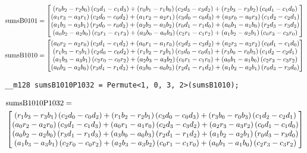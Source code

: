 \begin{align*}
\mathrm{sumsB0101} 
=
\begin{bmatrix}
  \left(r_0b_2 - r_2b_0\right)\left(c_3d_1 - c_1d_3\right)
+ \left(r_0b_1 - r_1b_0\right)\left(c_2d_3 - c_3d_2\right)
+ \left(r_2b_3 - r_3b_2\right)\left(c_0d_1 - c_1d_0\right)\\
  \left(a_1r_3 - a_3r_1\right)\left(c_2d_0 - c_0d_2\right)
+ \left(a_1r_2 - a_2r_1\right)\left(c_3d_0 - c_0d_3\right)
+ \left(a_3r_0 - a_0r_3\right)\left(c_1d_2 - c_2d_1\right)\\
  \left(a_1b_3 - a_3b_1\right)\left(r_2d_0 - r_0d_2\right)
+ \left(a_2b_3 - a_3b_2\right)\left(r_0d_1 - r_1d_0\right)
+ \left(a_0b_1 - a_1b_0\right)\left(r_2d_3 - r_3d_2\right)\\
  \left(a_0b_2 - a_2b_0\right)\left(c_3r_1 - c_1r_3\right)
+ \left(a_3b_0 - a_0b_3\right)\left(c_2r_1 - c_1r_2\right)
+ \left(a_1b_2 - a_2b_1\right)\left(c_0r_3 - c_3r_0\right)\\
\end{bmatrix}
\\
\mathrm{sumsB1010} 
=
\begin{bmatrix}
  \left(a_0r_2 - a_2r_0\right)\left(c_3d_1 - c_1d_3\right)
+ \left(a_0r_1 - a_1r_0\right)\left(c_2d_3 - c_3d_2\right)
+ \left(a_2r_3 - a_3r_2\right)\left(c_0d_1 - c_1d_0\right)\\
  \left(r_1b_3 - r_3b_1\right)\left(c_2d_0 - c_0d_2\right)
+ \left(r_1b_2 - r_2b_1\right)\left(c_3d_0 - c_0d_3\right)
+ \left(r_3b_0 - r_0b_3\right)\left(c_1d_2 - c_2d_1\right)\\
  \left(a_1b_3 - a_3b_1\right)\left(c_2r_0 - c_0r_2\right)
+ \left(a_2b_3 - a_3b_2\right)\left(c_0r_1 - c_1r_0\right)
+ \left(a_0b_1 - a_1b_0\right)\left(c_2r_3 - c_3r_2\right)\\
  \left(a_0b_2 - a_2b_0\right)\left(r_3d_1 - r_1d_3\right)
+ \left(a_3b_0 - a_0b_3\right)\left(r_2d_1 - r_1d_2\right)
+ \left(a_1b_2 - a_2b_1\right)\left(r_0d_3 - r_3d_0\right)\\
\end{bmatrix}
\end{align*}


\begin{verbatim}
__m128 sumsB1010P1032 = Permute<1, 0, 3, 2>(sumsB1010);
\end{verbatim}

\begin{align*}
&\mathrm{sumsB1010P1032} 
=\\
&\begin{bmatrix}
  \left(r_1b_3 - r_3b_1\right)\left(c_2d_0 - c_0d_2\right)
+ \left(r_1b_2 - r_2b_1\right)\left(c_3d_0 - c_0d_3\right)
+ \left(r_3b_0 - r_0b_3\right)\left(c_1d_2 - c_2d_1\right)\\
  \left(a_0r_2 - a_2r_0\right)\left(c_3d_1 - c_1d_3\right)
+ \left(a_0r_1 - a_1r_0\right)\left(c_2d_3 - c_3d_2\right)
+ \left(a_2r_3 - a_3r_2\right)\left(c_0d_1 - c_1d_0\right)\\
  \left(a_0b_2 - a_2b_0\right)\left(r_3d_1 - r_1d_3\right)
+ \left(a_3b_0 - a_0b_3\right)\left(r_2d_1 - r_1d_2\right)
+ \left(a_1b_2 - a_2b_1\right)\left(r_0d_3 - r_3d_0\right)\\
  \left(a_1b_3 - a_3b_1\right)\left(c_2r_0 - c_0r_2\right)
+ \left(a_2b_3 - a_3b_2\right)\left(c_0r_1 - c_1r_0\right)
+ \left(a_0b_1 - a_1b_0\right)\left(c_2r_3 - c_3r_2\right)\\
\end{bmatrix}
\end{align*}

